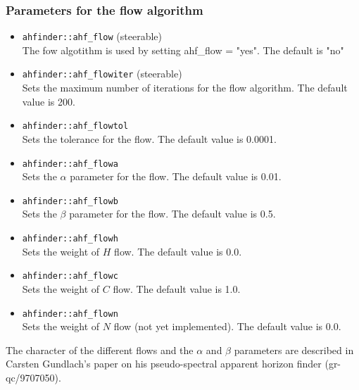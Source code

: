 \subsubsection*{Parameters for the flow algorithm}
\begin{itemize}
\item {\tt ahfinder::ahf\_flow} (steerable) \\
        The fow algotithm is used by setting ahf\_flow = "yes". The default
        is "no"
\item {\tt ahfinder::ahf\_flowiter} (steerable) \\
        Sets the maximum number of iterations for the flow algorithm. The
        default value is 200.
\item {\tt ahfinder::ahf\_flowtol} \\
        Sets the tolerance for the flow. The default value is 0.0001.
\item {\tt ahfinder::ahf\_flowa} \\
        Sets the $\alpha$ parameter for the flow. The default value is 0.01.
\item {\tt ahfinder::ahf\_flowb} \\
        Sets the $\beta$ parameter for the flow. The default value is 0.5.
\item {\tt ahfinder::ahf\_flowh} \\
        Sets the weight of $H$ flow. The default value is 0.0.
\item {\tt ahfinder::ahf\_flowc} \\
        Sets the weight of $C$ flow. The default value is 1.0.
\item {\tt ahfinder::ahf\_flown} \\
        Sets the weight of $N$ flow (not yet implemented). The default
        value is 0.0.
\end{itemize}
The character of the different flows and the $\alpha$ and $\beta$
parameters are described in Carsten Gundlach's paper on his
pseudo-spectral apparent horizon finder (gr-qc/9707050).
